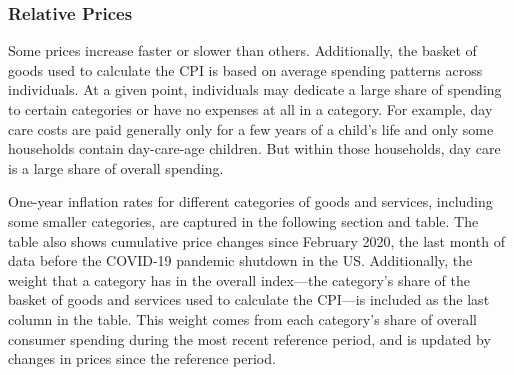 \begin{minipage}{0.76\textwidth}
\subsubsection*{Relative Prices}
\small Some prices increase faster or slower than others. Additionally, the basket of goods used to calculate the CPI is based on average spending patterns across individuals. At a given point, individuals may dedicate a large share of spending to certain categories or have no expenses at all in a category. For example, day care costs are paid generally only for a few years of a child's life and only some households contain day-care-age children. But within those households, day care is a large share of overall spending. 

One-year inflation rates for different categories of goods and services, including some smaller categories, are captured in the following section and table. The table also shows cumulative price changes since February 2020, the last month of data before the COVID-19 pandemic shutdown in the US. Additionally, the weight that a category has in the overall index---the category's share of the basket of goods and services used to calculate the CPI---is included as the last column in the table. This weight comes from each category's share of overall consumer spending during the most recent reference period, and is updated by changes in prices since the reference period. 
\end{minipage}
\newpage

\begin{minipage}{0.76\textwidth} 
\small 
\vspace{1.5mm}

\vspace*{-4mm}

{\footnotesize \hspace*{-2.5mm} }

\end{minipage}
\newpage
\vspace*{-12mm}

\begin{minipage}{0.76\textwidth} 
\small 
\end{minipage}

